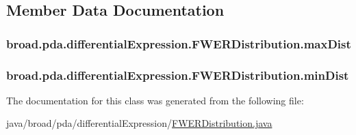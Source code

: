\subsection{Member Data Documentation}
\hypertarget{classbroad_1_1pda_1_1differential_expression_1_1_f_w_e_r_distribution_aaf7276a0d911c55ce4142af6316501bc}{
\subsubsection[{max\+Dist}]{ broad.\+pda.\+differential\+Expression.\+F\+W\+E\+R\+Distribution.\+max\+Dist}}\label{classbroad_1_1pda_1_1differential_expression_1_1_f_w_e_r_distribution_aaf7276a0d911c55ce4142af6316501bc}
\hypertarget{classbroad_1_1pda_1_1differential_expression_1_1_f_w_e_r_distribution_a6359849d46c899f9e12afb7bcb343816}{
\subsubsection[{min\+Dist}]{ broad.\+pda.\+differential\+Expression.\+F\+W\+E\+R\+Distribution.\+min\+Dist}}\label{classbroad_1_1pda_1_1differential_expression_1_1_f_w_e_r_distribution_a6359849d46c899f9e12afb7bcb343816}


The documentation for this class was generated from the following file\+:\begin{DoxyCompactItemize}
\item 
java/broad/pda/differential\+Expression/\hyperlink{_f_w_e_r_distribution_8java}{F\+W\+E\+R\+Distribution.\+java}\end{DoxyCompactItemize}

